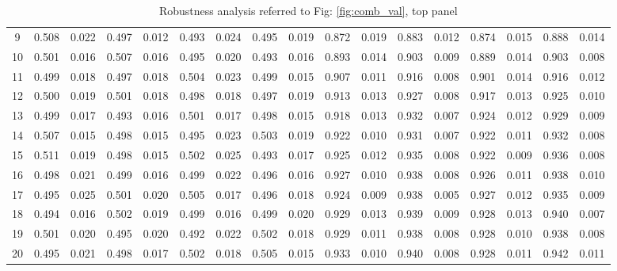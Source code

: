 \documentclass{article}
\begin{document}
\begin{table}[H]
{\begin{tabular}{|c|c|c|c|c|c|c|c|c|c|c|c|c|c|c|c|c|}
     9 & 0.508 & 0.022 & 0.497 & 0.012 & 0.493 & 0.024 & 0.495 & 0.019 & 0.872 & 0.019 & 0.883 & 0.012 & 0.874 & 0.015 & 0.888 & 0.014 \\ 
    10 & 0.501 & 0.016 & 0.507 & 0.016 & 0.495 & 0.020 & 0.493 & 0.016 & 0.893 & 0.014 & 0.903 & 0.009 & 0.889 & 0.014 & 0.903 & 0.008 \\ 
    11 & 0.499 & 0.018 & 0.497 & 0.018 & 0.504 & 0.023 & 0.499 & 0.015 & 0.907 & 0.011 & 0.916 & 0.008 & 0.901 & 0.014 & 0.916 & 0.012 \\ 
    12 & 0.500 & 0.019 & 0.501 & 0.018 & 0.498 & 0.018 & 0.497 & 0.019 & 0.913 & 0.013 & 0.927 & 0.008 & 0.917 & 0.013 & 0.925 & 0.010 \\ 
    13 & 0.499 & 0.017 & 0.493 & 0.016 & 0.501 & 0.017 & 0.498 & 0.015 & 0.918 & 0.013 & 0.932 & 0.007 & 0.924 & 0.012 & 0.929 & 0.009 \\ 
    14 & 0.507 & 0.015 & 0.498 & 0.015 & 0.495 & 0.023 & 0.503 & 0.019 & 0.922 & 0.010 & 0.931 & 0.007 & 0.922 & 0.011 & 0.932 & 0.008 \\ 
    15 & 0.511 & 0.019 & 0.498 & 0.015 & 0.502 & 0.025 & 0.493 & 0.017 & 0.925 & 0.012 & 0.935 & 0.008 & 0.922 & 0.009 & 0.936 & 0.008 \\ 
    16 & 0.498 & 0.021 & 0.499 & 0.016 & 0.499 & 0.022 & 0.496 & 0.016 & 0.927 & 0.010 & 0.938 & 0.008 & 0.926 & 0.011 & 0.938 & 0.010 \\ 
    17 & 0.495 & 0.025 & 0.501 & 0.020 & 0.505 & 0.017 & 0.496 & 0.018 & 0.924 & 0.009 & 0.938 & 0.005 & 0.927 & 0.012 & 0.935 & 0.009 \\ 
    18 & 0.494 & 0.016 & 0.502 & 0.019 & 0.499 & 0.016 & 0.499 & 0.020 & 0.929 & 0.013 & 0.939 & 0.009 & 0.928 & 0.013 & 0.940 & 0.007 \\ 
    19 & 0.501 & 0.020 & 0.495 & 0.020 & 0.492 & 0.022 & 0.502 & 0.018 & 0.929 & 0.011 & 0.938 & 0.008 & 0.928 & 0.010 & 0.938 & 0.008 \\ 
    20 & 0.495 & 0.021 & 0.498 & 0.017 & 0.502 & 0.018 & 0.505 & 0.015 & 0.933 & 0.010 & 0.940 & 0.008 & 0.928 & 0.011 & 0.942 & 0.011 \\ 
   \hline
\end{tabular}
}

\caption{Robustness analysis referred to Fig: \ref{fig:comb_val}, top panel}
\label{tab:comb_val_top}
\end{table} %
\end{document}
